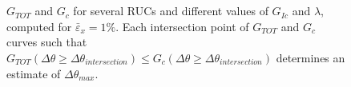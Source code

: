 \begin{figure}[!htbp]
    \\
    \
\caption{$G_{TOT}$ and $G_{c}$ for several RUCs and different values of $G_{Ic}$ and $\lambda$, computed for $\bar{\varepsilon}_{x}=1\%$. Each intersection point of $G_{TOT}$ and $G_{c}$ curves such that $G_{TOT}\left(\Delta\theta\geq\Delta\theta_{intersection}\right)\leq G_{c}\left(\Delta\theta\geq\Delta\theta_{intersection}\right)$ determines an estimate of $\Delta\theta_{max}$.}\label{paperE:fig:debondsize}
\end{figure}

